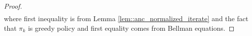 \documentclass{article} %
\newcommand{\cP}{\mathcal{P}}
\newcommand*{\para}[1]{\left({#1}\right)}
\begin{document}
\begin{proof}
\begin{align*}
       \end{align*}
       where first inequality is from Lemma \ref{lem::anc_normalized_iterate} and the fact that $\pi_k$ is greedy policy and first equality comes from Bellman equations.
\end{proof}
\end{document}
